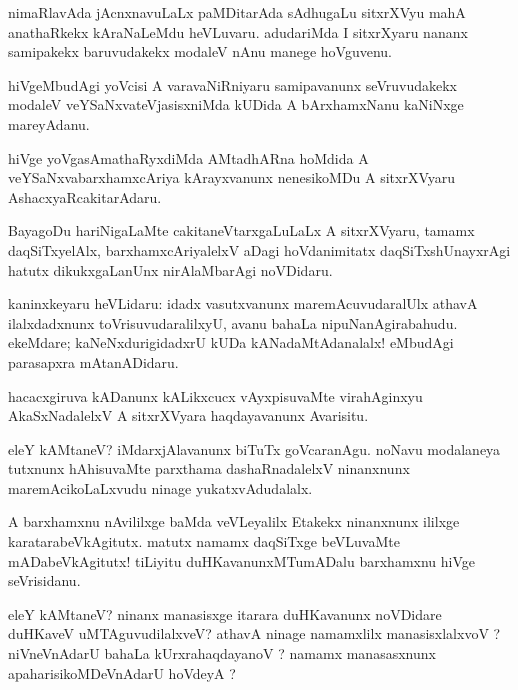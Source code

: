 \documentclass{article}
\begin{document}
\begin{mn}
nimaRlavAda jAcnxnavuLaLx paMDitarAda sAdhugaLu sitxrXVyu mahA anathaRkekx kAraNaLeMdu heVLuvaru.
adudariMda I sitxrXyaru nananx samipakekx baruvudakekx modaleV nAnu manege hoVguvenu.
\end{mn}

\begin{mn}
hiVgeMbudAgi yoVcisi A varavaNiRniyaru samipavanunx seVruvudakekx modaleV veYSaNxvateVjasisxniMda 
kUDida A bArxhamxNanu kaNiNxge mareyAdanu.
\end{mn}

\begin{mn}
hiVge yoVgasAmathaRyxdiMda AMtadhARna hoMdida A veYSaNxvabarxhamxcAriya kArayxvanunx nenesikoMDu 
A sitxrXVyaru AshacxyaRcakitarAdaru.
\end{mn}

\begin{mn}
BayagoDu hariNigaLaMte cakitaneVtarxgaLuLaLx A sitxrXVyaru, tamamx daqSiTxyelAlx, 
barxhamxcAriyalelxV aDagi hoVdanimitatx daqSiTxshUnayxrAgi hatutx dikukxgaLanUnx nirAlaMbarAgi 
noVDidaru.
\end{mn}

\begin{mn}
kaninxkeyaru heVLidaru: idadx vasutxvanunx maremAcuvudaralUlx athavA ilalxdadxnunx 
toVrisuvudaralilxyU, avanu bahaLa nipuNanAgirabahudu. ekeMdare; kaNeNxdurigidadxrU kUDa 
kANadaMtAdanalalx! eMbudAgi parasapxra mAtanADidaru.
\end{mn}

\begin{mn}
hacacxgiruva kADanunx  kALikxcucx vAyxpisuvaMte virahAginxyu AkaSxNadalelxV A sitxrXVyara 
haqdayavanunx Avarisitu.
\end{mn}

\begin{mn}
eleY kAMtaneV? iMdarxjAlavanunx biTuTx goVcaranAgu. noNavu modalaneya tutxnunx hAhisuvaMte parxthama
dashaRnadalelxV ninanxnunx maremAcikoLaLxvudu ninage yukatxvAdudalalx.
\end{mn}

\begin{mn}
A barxhamxnu nAvililxge baMda veVLeyalilx Etakekx ninanxnunx ililxge karatarabeVkAgitutx. 
matutx namamx daqSiTxge beVLuvaMte mADabeVkAgitutx! tiLiyitu duHKavanunxMTumADalu barxhamxnu 
hiVge seVrisidanu.
\end{mn}

\begin{mn}
eleY kAMtaneV? ninanx manasisxge itarara duHKavanunx noVDidare duHKaveV uMTAguvudilalxveV? athavA
ninage namamxlilx manasisxlalxvoV ? niVneVnAdarU bahaLa kUrxrahaqdayanoV ? 
namamx manasasxnunx apaharisikoMDeVnAdarU hoVdeyA ?
\end{mn}
\end{document}
